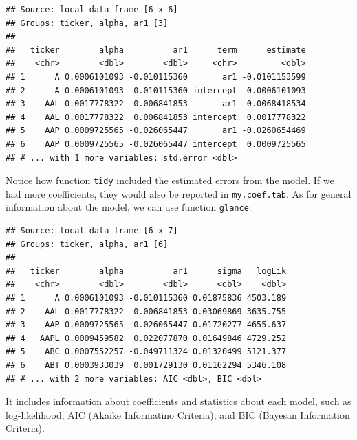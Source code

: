 \documentclass[11pt,]{book}
\newenvironment{Shaded}{\begin{snugshade}}{\end{snugshade}}
\newcommand{\KeywordTok}[1]{\textcolor[rgb]{0.27,0.27,0.27}{\textbf{#1}}}
\newcommand{\StringTok}[1]{\textcolor[rgb]{0.5,0.5,0.5}{#1}}
\newcommand{\CommentTok}[1]{\textcolor[rgb]{0.56,0.35,0.01}{\textit{#1}}}
\newcommand{\OperatorTok}[1]{\textcolor[rgb]{0.81,0.36,0.00}{\textbf{#1}}}
\newcommand{\NormalTok}[1]{#1}
\begin{document}
\begin{verbatim}
## Source: local data frame [6 x 6]
## Groups: ticker, alpha, ar1 [3]
## 
##   ticker        alpha          ar1      term      estimate
##    <chr>        <dbl>        <dbl>     <chr>         <dbl>
## 1      A 0.0006101093 -0.010115360       ar1 -0.0101153599
## 2      A 0.0006101093 -0.010115360 intercept  0.0006101093
## 3    AAL 0.0017778322  0.006841853       ar1  0.0068418534
## 4    AAL 0.0017778322  0.006841853 intercept  0.0017778322
## 5    AAP 0.0009725565 -0.026065447       ar1 -0.0260654469
## 6    AAP 0.0009725565 -0.026065447 intercept  0.0009725565
## # ... with 1 more variables: std.error <dbl>
\end{verbatim}

Notice how function \texttt{tidy} included the estimated errors from the
model. If we had more coefficients, they would also be reported in
\texttt{my.coef.tab}. As for general information about the model, we can
use function \texttt{glance}: 

\begin{Shaded}
\end{Shaded}

\begin{verbatim}
## Source: local data frame [6 x 7]
## Groups: ticker, alpha, ar1 [6]
## 
##   ticker        alpha          ar1      sigma   logLik
##    <chr>        <dbl>        <dbl>      <dbl>    <dbl>
## 1      A 0.0006101093 -0.010115360 0.01875836 4503.189
## 2    AAL 0.0017778322  0.006841853 0.03069869 3635.755
## 3    AAP 0.0009725565 -0.026065447 0.01720277 4655.637
## 4   AAPL 0.0009459582  0.022077870 0.01649846 4729.252
## 5    ABC 0.0007552257 -0.049711324 0.01320499 5121.377
## 6    ABT 0.0003933039  0.001729130 0.01162294 5346.108
## # ... with 2 more variables: AIC <dbl>, BIC <dbl>
\end{verbatim}

It includes information about coefficients and statistics about each
model, such as log-likelihood, AIC (Akaike Informatino Criteria), and
BIC (Bayesan Information Criteria).
\end{document}
